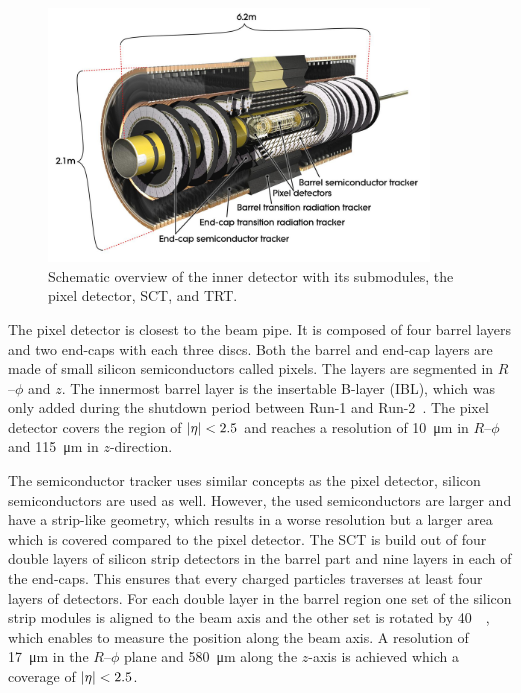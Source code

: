 \begin{figure}[htb]
    \centering
    \includegraphics[width=0.9\textwidth]{./figures/setup/inner_detector.jpg}
    \caption{Schematic overview of the inner detector with its submodules, the pixel detector, SCT, and TRT\@.~\cite{ImageID}}\label{fig:setup:id}
\end{figure}

The pixel detector is closest to the beam pipe.
It is composed of four barrel layers and two end-caps with each three discs.
Both the barrel and end-cap layers are made of small silicon semiconductors called pixels.
The layers are segmented in $R$\nobreakdash--$\phi$ and $z$.
The innermost barrel layer is the insertable B-layer (IBL), which was only added during the shutdown period
between Run-1 and Run-2~\cite{ATLAS-TDR-19}.
The pixel detector covers the region of $\left|\eta\right| < 2.5$ and reaches a resolution of \SI{10}{\um} in
$R$\nobreakdash--$\phi$ and \SI{115}{\um} in $z$-direction.

The semiconductor tracker uses similar concepts as the pixel detector, silicon semiconductors are used as well.
However, the used semiconductors are larger and have a strip-like geometry, which results in a worse resolution
but a larger area which is covered compared to the pixel detector.
The SCT is build out of four double layers of silicon strip detectors in the barrel part and nine layers in each of the
end-caps.
This ensures that every charged particles traverses at least four layers of detectors.
For each double layer in the barrel region one set of the silicon strip modules is aligned to the beam axis and the other set
is rotated by \SI{40}{\milli\rad}, which enables to measure the position along the beam axis.
A resolution of \SI{17}{\um} in the $R$\nobreakdash--$\phi$ plane and \SI{580}{\um} along the
$z$-axis is achieved which a coverage of $\left|\eta\right| < 2.5$.

